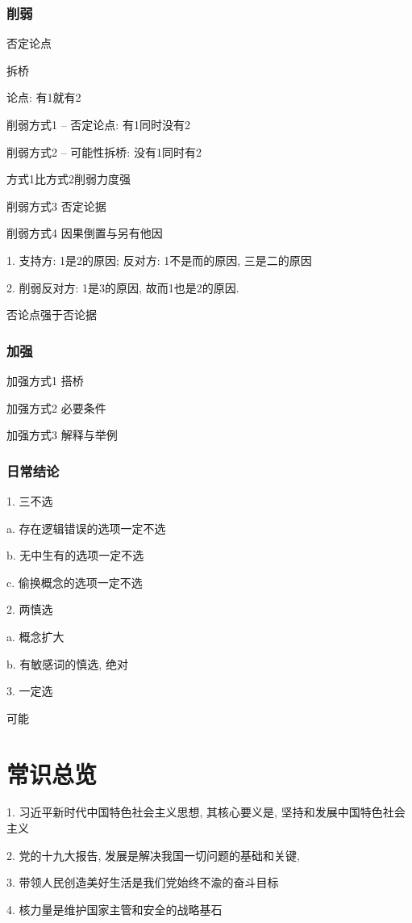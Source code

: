 \documentclass[UTF8]{ctexart}
\begin{document}
\subsubsection{削弱}
否定论点

拆桥

论点: 有1就有2

削弱方式1 -- 否定论点: 有1同时没有2

削弱方式2 -- 可能性拆桥: 没有1同时有2

方式1比方式2削弱力度强

削弱方式3 否定论据

削弱方式4  因果倒置与另有他因

1. 支持方: 1是2的原因; 反对方: 1不是而的原因, 三是二的原因

2. 削弱反对方: 1是3的原因, 故而1也是2的原因.

否论点强于否论据


\subsubsection{加强}

加强方式1  搭桥

加强方式2 必要条件

加强方式3 解释与举例

\subsubsection{日常结论}
1. 三不选

a. 存在逻辑错误的选项一定不选

b. 无中生有的选项一定不选

c. 偷换概念的选项一定不选

2. 两慎选

a. 概念扩大

b. 有敏感词的慎选, 绝对

3. 一定选

可能
\section{常识总览}

1. 习近平新时代中国特色社会主义思想, 其核心要义是, 坚持和发展中国特色社会主义

2. 党的十九大报告, 发展是解决我国一切问题的基础和关键,

3. 带领人民创造美好生活是我们党始终不渝的奋斗目标

4. 核力量是维护国家主管和安全的战略基石
\end{document}
